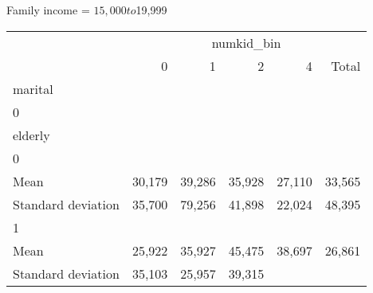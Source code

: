 Family income = $15,000 to $19,999
\begin{tabular}{llllll}
\cline{1-6}
\multicolumn{1}{c}{} &
  \multicolumn{5}{|c}{numkid\_bin} \\
\multicolumn{1}{c}{} &
  \multicolumn{1}{|r}{0} &
  \multicolumn{1}{r}{1} &
  \multicolumn{1}{r}{2} &
  \multicolumn{1}{r}{4} &
  \multicolumn{1}{r}{Total} \\
\cline{1-6}
\multicolumn{1}{l}{marital} &
  \multicolumn{1}{|r}{} &
  \multicolumn{1}{r}{} &
  \multicolumn{1}{r}{} &
  \multicolumn{1}{r}{} &
  \multicolumn{1}{r}{} \\
\multicolumn{1}{l}{\hspace{1em}0} &
  \multicolumn{1}{|r}{} &
  \multicolumn{1}{r}{} &
  \multicolumn{1}{r}{} &
  \multicolumn{1}{r}{} &
  \multicolumn{1}{r}{} \\
\multicolumn{1}{l}{\hspace{2em}elderly} &
  \multicolumn{1}{|r}{} &
  \multicolumn{1}{r}{} &
  \multicolumn{1}{r}{} &
  \multicolumn{1}{r}{} &
  \multicolumn{1}{r}{} \\
\multicolumn{1}{l}{\hspace{3em}0} &
  \multicolumn{1}{|r}{} &
  \multicolumn{1}{r}{} &
  \multicolumn{1}{r}{} &
  \multicolumn{1}{r}{} &
  \multicolumn{1}{r}{} \\
\multicolumn{1}{l}{\hspace{4em}Mean} &
  \multicolumn{1}{|r}{30,179} &
  \multicolumn{1}{r}{39,286} &
  \multicolumn{1}{r}{35,928} &
  \multicolumn{1}{r}{27,110} &
  \multicolumn{1}{r}{33,565} \\
\multicolumn{1}{l}{\hspace{4em}Standard deviation} &
  \multicolumn{1}{|r}{35,700} &
  \multicolumn{1}{r}{79,256} &
  \multicolumn{1}{r}{41,898} &
  \multicolumn{1}{r}{22,024} &
  \multicolumn{1}{r}{48,395} \\
\multicolumn{1}{l}{\hspace{3em}1} &
  \multicolumn{1}{|r}{} &
  \multicolumn{1}{r}{} &
  \multicolumn{1}{r}{} &
  \multicolumn{1}{r}{} &
  \multicolumn{1}{r}{} \\
\multicolumn{1}{l}{\hspace{4em}Mean} &
  \multicolumn{1}{|r}{25,922} &
  \multicolumn{1}{r}{35,927} &
  \multicolumn{1}{r}{45,475} &
  \multicolumn{1}{r}{38,697} &
  \multicolumn{1}{r}{26,861} \\
\multicolumn{1}{l}{\hspace{4em}Standard deviation} &
  \multicolumn{1}{|r}{35,103} &
  \multicolumn{1}{r}{25,957} &
  \multicolumn{1}{r}{39,315} &

\end{tabular}

